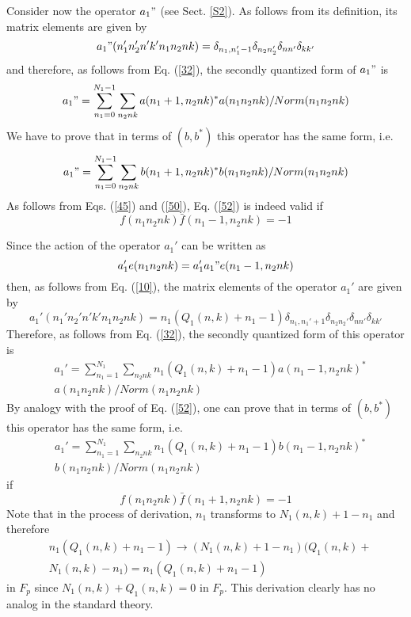 \documentclass[a4paper,12pt]{article}%
\begin{document}
Consider now the operator $a_1"$ (see Sect. \ref{S2}).
As follows from its definition, its matrix elements are
given by
\begin{equation}
a_1"(n_1'n_2'n'k'n_1n_2nk)=\delta_{n_1,n_1'-1}
\delta_{n_2n_2'}\delta_{nn'}\delta_{kk'}
\label{50}
\end{equation}
and therefore, as follows from Eq. (\ref{32}),
the secondly quantized form of $a_1"$ is
\begin{eqnarray}
a_1"=\sum_{n_1=0}^{N_1-1}\sum_{n_2nk}a(n_1+1,n_2nk)^*
a(n_1n_2nk)/Norm(n_1n_2nk)
\label{51}
\end{eqnarray}
We have to prove that in terms of $(b,b^*)$ this operator
has the same form, i.e.
\begin{eqnarray}
a_1"=\sum_{n_1=0}^{N_1-1}\sum_{n_2nk}b(n_1+1,n_2nk)^*
b(n_1n_2nk)/Norm(n_1n_2nk)
\label{52}
\end{eqnarray}
As follows from Eqs. (\ref{45}) and (\ref{50}), Eq. (\ref{52})
is indeed valid if 
\begin{equation}
f(n_1n_2nk){\bar f}(n_1-1,n_2nk)=-1
\label{53}
\end{equation} 

Since the action of the operator $a_1'$ can be written as
$$a_1'e(n_1n_2nk)=a_1'a_1"e(n_1-1,n_2nk)$$
then, as follows from Eq. (\ref{10}), the matrix
elements of the operator $a_1'$ are given by
\begin{equation}
a_1'(n_1'n_2'n'k'n_1n_2nk)=n_1(Q_1(n,k)+n_1-1)\delta_{n_1,n_1'+1}
\delta_{n_2n_2'}\delta_{nn'}\delta_{kk'}
\label{54}
\end{equation}
Therefore, as follows from Eq. (\ref{32}),
the secondly quantized form of this operator is
\begin{eqnarray}
&a_1'=\sum_{n_1=1}^{N_1}\sum_{n_2nk}n_1(Q_1(n,k)+n_1-1)
a(n_1-1,n_2nk)^*\nonumber\\
&a(n_1n_2nk)/Norm(n_1n_2nk)
\label{55}
\end{eqnarray}
By analogy with the proof of Eq. (\ref{52}), one
can prove that in terms of $(b,b^*)$ this operator
has the same form, i.e.
\begin{eqnarray}
&a_1'=\sum_{n_1=1}^{N_1}\sum_{n_2nk}n_1(Q_1(n,k)+n_1-1)
b(n_1-1,n_2nk)^*\nonumber\\
&b(n_1n_2nk)/Norm(n_1n_2nk)
\label{56}
\end{eqnarray}
if
\begin{equation}
f(n_1n_2nk){\bar f}(n_1+1,n_2nk)=-1
\label{57}
\end{equation} 
Note that in the process of derivation, $n_1$ transforms to
$N_1(n,k)+1-n_1$ and therefore
\begin{eqnarray}
&n_1(Q_1(n,k)+n_1-1)\rightarrow (N_1(n,k)+1-n_1)(Q_1(n,k)+\nonumber\\
&N_1(n,k)-n_1)=n_1(Q_1(n,k)+n_1-1)
\label{58}
\end{eqnarray}
in $F_p$ since $N_1(n,k)+Q_1(n,k)=0$ in $F_p$. This derivation 
clearly has no analog in the standard theory.  
\end{document}
